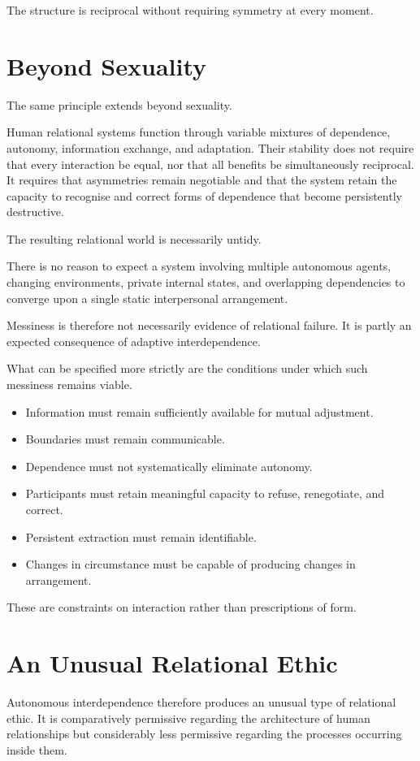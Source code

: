 \documentclass[11pt, a4paper]{article}
\begin{document}
The structure is reciprocal without requiring symmetry at every moment.

\section*{Beyond Sexuality}
The same principle extends beyond sexuality.

Human relational systems function through variable mixtures of dependence, autonomy, information exchange, and adaptation. Their stability does not require that every interaction be equal, nor that all benefits be simultaneously reciprocal. It requires that asymmetries remain negotiable and that the system retain the capacity to recognise and correct forms of dependence that become persistently destructive.

The resulting relational world is necessarily untidy.

There is no reason to expect a system involving multiple autonomous agents, changing environments, private internal states, and overlapping dependencies to converge upon a single static interpersonal arrangement.

Messiness is therefore not necessarily evidence of relational failure. It is partly an expected consequence of adaptive interdependence.

What can be specified more strictly are the conditions under which such messiness remains viable.

\begin{itemize}[leftmargin=*]
    \item Information must remain sufficiently available for mutual adjustment.
    \item Boundaries must remain communicable.
    \item Dependence must not systematically eliminate autonomy.
    \item Participants must retain meaningful capacity to refuse, renegotiate, and correct.
    \item Persistent extraction must remain identifiable.
    \item Changes in circumstance must be capable of producing changes in arrangement.
\end{itemize}

These are constraints on interaction rather than prescriptions of form.

\section*{An Unusual Relational Ethic}
Autonomous interdependence therefore produces an unusual type of relational ethic. It is comparatively permissive regarding the architecture of human relationships but considerably less permissive regarding the processes occurring inside them.
\end{document}

